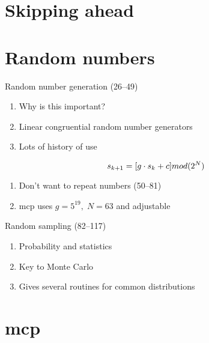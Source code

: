 \documentclass[aspectratio=1610,pdftex,dvipsnames,compress,xcolor={dvipsnames}]{beamer}
\newcommand{\acs}{\acrshort} %
\begin{document}
\section{Skipping ahead}
\section{Random numbers}


\addtocounter{framenumber}{-2} 
\begin{frame}{Random number generation (26--49)}
    \begin{enumerate}[series=outerlist,topsep=0pt,itemsep=21pt,leftmargin=*,label=(\arabic*)]
        \item[]Why is this important?
        \item[]Linear congruential random number generators
        \item[]Lots of history of use
    \end{enumerate}

    \vspace*{\fill}

    \begin{equation}
        \LARGE
        s_{k+1} = [g \cdot s_k + c] mod(2^N)
    \end{equation}

    \vspace*{\fill}

    \begin{enumerate}[series=outerlist,topsep=0pt,itemsep=21pt,leftmargin=*,label=(\arabic*)]
        \item[]Don't want to repeat numbers (50--81)
        \item[]\acs{mcp} uses $g = 5^{19}, \; N = 63$ and adjustable
    \end{enumerate}
\end{frame}


\begin{frame}{Random sampling (82--117)}
    \begin{enumerate}[series=outerlist,topsep=0pt,itemsep=21pt,leftmargin=*,label=(\arabic*)]
        \item[]Probability and statistics
        \item[]Key to Monte Carlo
        \item[]Gives several routines for common distributions
    \end{enumerate}
\end{frame}


\section{\acs{mcp}}
\end{document}
